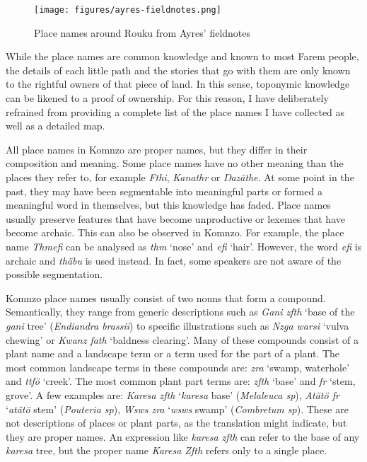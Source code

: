 \begin{figure}
        \texttt{[image: figures/ayres-fieldnotes.png]}
    \caption{Place names around Rouku from Ayres' fieldnotes}
    \label{fig:ayresfieldnotes}
\end{figure}

While the place names are common knowledge and known to most Farem people, the details of each little path and the stories that go with them are only known to the rightful owners of that piece of land. In this sense, toponymic knowledge can be likened to a proof of ownership. For this reason, I have deliberately refrained from providing a complete list of the place names I have collected as well as a detailed map.

All place names in Komnzo are proper names, but they differ in their composition and meaning. Some place names have no other meaning than the places they refer to, for example \textit{Fthi}, \textit{Kanathr} or \textit{Ŋazäthe}. At some point in the past, they may have been segmentable into meaningful parts or formed a meaningful word in themselves, but this knowledge has faded. Place names usually preserve features that have become unproductive or lexemes that have become archaic. This can also be observed in Komnzo. For example, the place name \textit{Thmefi} can be analysed as \textit{thm} `nose' and \textit{efi} `hair'. However, the word \textit{efi} is archaic and \textit{thäbu} is used instead. In fact, some speakers are not aware of the possible segmentation.

Komnzo place names usually consist of two nouns that form a compound. Semantically, they range from generic descriptions such as \textit{Gani zfth} `base of the \textit{gani} tree' (\textit{Endiandra brassii}) to specific illustrations such as \textit{Nzga warsi} `vulva chewing' or \textit{Kwanz fath} `baldness clearing'. Many of these compounds consist of a plant name and a landscape term or a term used for the part of a plant. The most common landscape terms in these compounds are: \textit{zra} `swamp, waterhole’ and \textit{ttfö} `creek’. The most common plant part terms are: \textit{zfth} `base’ and \textit{fr} `stem, grove’. A few examples are: \textit{Karesa zfth} `\textit{karesa} base' (\textit{Melaleuca sp}), \textit{Atätö fr} `\textit{atätö} stem' (\textit{Pouteria sp}), \textit{Wsws zra} `\textit{wsws} swamp' (\textit{Combretum sp}). These are not descriptions of places or plant parts, as the translation might indicate, but they are proper names. An expression like \textit{karesa zfth} can refer to the base of any \textit{karesa} tree, but the proper name \textit{Karesa Zfth} refers only to a single place.

